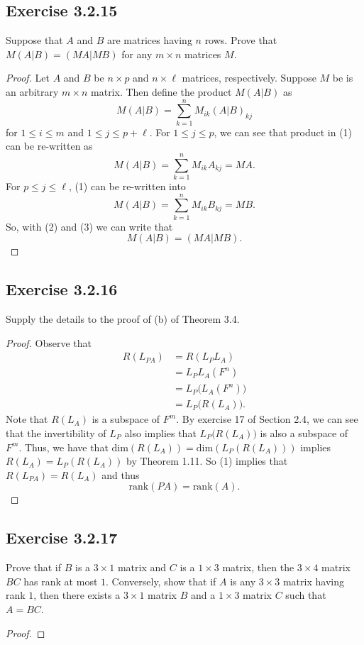 \subsection*{Exercise 3.2.15} Suppose that \( A   \) and \( B  \) are matrices having \( n  \) rows. Prove that \( M(A|B) = (MA|MB) \) for any \( m \times n  \) matrices \( M  \).
\begin{proof}
Let \( A  \) and \( B  \) be \( n \times p  \) and \( n \times \ell  \) matrices, respectively. Suppose \( M  \) be is an arbitrary \( m \times n  \) matrix. Then define the product \( M (A | B ) \) as 
\[  M (A|B) = \sum_{ k =1  }^{ n  } {M}_{ik } (A | B)_{kj} \tag{1} \]
for \( 1 \leq i \leq m  \) and \( 1 \leq j \leq  p + \ell  \). For \( 1 \leq j \leq p  \), we can see that product in (1) can be re-written as
\[  M (A|B) = \sum_{ k= 1  }^{ n } {M}_{ik } {A}_{kj} = MA. \tag{2} \]
For \( p \leq j \leq \ell  \), (1) can be re-written into
\[  M (A|B) = \sum_{ k=1  }^{ n } {M}_{ik } {B}_{kj} = MB. \tag{3} \]
So, with (2) and (3) we can write that
\[  M (A|B) = (MA | MB). \]
\end{proof}

\subsection*{Exercise 3.2.16} Supply the details to the proof of (b) of Theorem 3.4.
\begin{proof}
Observe that
\begin{align*}
   R({L}_{PA}) &= R({L}_{P} {L}_{A}) \\
               &=  {L}_{P} {L}_{A}(F^{n}) \\
               &= {L}_{P} \Big( {L}_{A} (F^{n}) \Big) \\
               &= {L}_{P} \Big(  R( {L}_{A}) \Big). \tag{1}
\end{align*}
Note that \( R({L}_{A})  \) is a subspace of \( F^{m} \). By exercise 17 of Section 2.4, we can see that the invertibility of \( {L}_{P} \) also implies that \( {L}_{P}\Big(R({L}_{A})\Big) \) is also a subspace of \( F^{m} \). Thus, we have that \( \text{dim}(R({L}_{A})) = \text{dim}({L}_{P}({R}({L}_{A}))) \) implies \( R({L}_{A}) = {L}_{P}(R({L}_{A})) \) by Theorem 1.11. So (1) implies that \( R({L}_{PA}) = R({L}_{A})   \) and thus \[ \text{rank}(PA) = \text{rank}(A). \]
\end{proof}

\subsection*{Exercise 3.2.17} Prove that if \( B  \) is a \( 3 \times 1  \) matrix and \( C  \) is a \( 1 \times 3 \) matrix, then the \( 3 \times 4 \) matrix \( BC  \) has rank at most \( 1  \). Conversely, show that if \( A  \) is any \( 3 \times 3  \) matrix having rank \( 1  \), then there exists a \( 3 \times 1  \) matrix \( B  \) and a \( 1 \times 3  \) matrix \( C  \) such that \( A = BC  \).
\begin{proof}

\end{proof}

